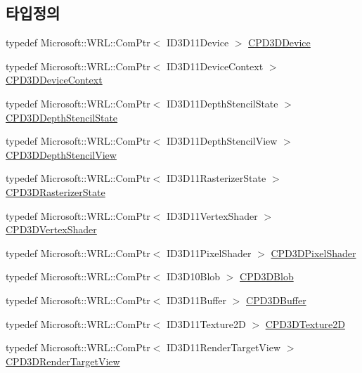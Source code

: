\subsection*{타입정의}
\begin{DoxyCompactItemize}
\item 
typedef Microsoft\+::\+W\+R\+L\+::\+Com\+Ptr$<$ I\+D3\+D11\+Device $>$ \hyperlink{namespace_m_n_l_a1eec210db8f309a4a9ac0d9658784c31}{C\+P\+D3\+D\+Device}
\item 
typedef Microsoft\+::\+W\+R\+L\+::\+Com\+Ptr$<$ I\+D3\+D11\+Device\+Context $>$ \hyperlink{namespace_m_n_l_aab3aabb6c9360e44ddc8b0bb563c2107}{C\+P\+D3\+D\+Device\+Context}
\item 
typedef Microsoft\+::\+W\+R\+L\+::\+Com\+Ptr$<$ I\+D3\+D11\+Depth\+Stencil\+State $>$ \hyperlink{namespace_m_n_l_a8209b06065c025e5d6bc2e8ee5925faf}{C\+P\+D3\+D\+Depth\+Stencil\+State}
\item 
typedef Microsoft\+::\+W\+R\+L\+::\+Com\+Ptr$<$ I\+D3\+D11\+Depth\+Stencil\+View $>$ \hyperlink{namespace_m_n_l_a12b3c209d76ede855300e637f4192a04}{C\+P\+D3\+D\+Depth\+Stencil\+View}
\item 
typedef Microsoft\+::\+W\+R\+L\+::\+Com\+Ptr$<$ I\+D3\+D11\+Rasterizer\+State $>$ \hyperlink{namespace_m_n_l_aa6c2682c64c5b58c458c36bb424f1e56}{C\+P\+D3\+D\+Rasterizer\+State}
\item 
typedef Microsoft\+::\+W\+R\+L\+::\+Com\+Ptr$<$ I\+D3\+D11\+Vertex\+Shader $>$ \hyperlink{namespace_m_n_l_a8036d713226061c4827b537821fbf79b}{C\+P\+D3\+D\+Vertex\+Shader}
\item 
typedef Microsoft\+::\+W\+R\+L\+::\+Com\+Ptr$<$ I\+D3\+D11\+Pixel\+Shader $>$ \hyperlink{namespace_m_n_l_a4d6bd408e6e19137a03728583296f12a}{C\+P\+D3\+D\+Pixel\+Shader}
\item 
typedef Microsoft\+::\+W\+R\+L\+::\+Com\+Ptr$<$ I\+D3\+D10\+Blob $>$ \hyperlink{namespace_m_n_l_a3716e3bee60c31fe1b7b5dd5a82db59a}{C\+P\+D3\+D\+Blob}
\item 
typedef Microsoft\+::\+W\+R\+L\+::\+Com\+Ptr$<$ I\+D3\+D11\+Buffer $>$ \hyperlink{namespace_m_n_l_aab9c90a8c27ac6410a9cc7cd89efeef1}{C\+P\+D3\+D\+Buffer}
\item 
typedef Microsoft\+::\+W\+R\+L\+::\+Com\+Ptr$<$ I\+D3\+D11\+Texture2D $>$ \hyperlink{namespace_m_n_l_addb538e1cbd1f443e6db5e6312487c51}{C\+P\+D3\+D\+Texture2D}
\item 
typedef Microsoft\+::\+W\+R\+L\+::\+Com\+Ptr$<$ I\+D3\+D11\+Render\+Target\+View $>$ \hyperlink{namespace_m_n_l_aa08a7c0b5ac9d877dacb57b9306b7b8c}{C\+P\+D3\+D\+Render\+Target\+View}

\end{DoxyCompactItemize}

